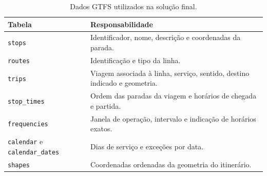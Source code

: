 \documentclass[12pt,oneside,a4paper,brazil,chapter=TITLE]{abntex2}
\begin{document}
\begin{apendicesenv}
\begin{table}[H]\centering\small
\caption{Dados GTFS utilizados na solução final.}\label{tab:modelos-importacao}
\begin{tabular}{p{3.3cm}p{9.7cm}}\hline
Tabela & Responsabilidade\\\hline
\texttt{stops} & Identificador, nome, descrição e coordenadas da parada.\\
\texttt{routes} & Identificação e tipo da linha.\\
\texttt{trips} & Viagem associada à linha, serviço, sentido, destino indicado e geometria.\\
\texttt{stop\_times} & Ordem das paradas da viagem e horários de chegada e partida.\\
\texttt{frequencies} & Janela de operação, intervalo e indicação de horários exatos.\\
\texttt{calendar} e \texttt{calendar\_dates} & Dias de serviço e exceções por data.\\
\texttt{shapes} & Coordenadas ordenadas da geometria do itinerário.\\\hline
\end{tabular}
\end{table}


\end{apendicesenv}
\end{document}
